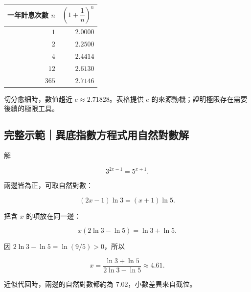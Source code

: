 \documentclass[11pt,a4paper]{article}
\newcounter{none}
\begin{document}
{\def\LTcaptype{none} %
\begin{longtable}[]{@{}rr@{}}
\toprule\noalign{}
一年計息次數 \(n\) & \(\left(1+\dfrac1n\right)^n\) \\
\midrule\noalign{}
\endhead
\bottomrule\noalign{}
\endlastfoot
\(1\) & \(2.0000\) \\
\(2\) & \(2.2500\) \\
\(4\) & \(2.4414\) \\
\(12\) & \(2.6130\) \\
\(365\) & \(2.7146\) \\
\end{longtable}
}

切分愈細時，數值趨近 \(e\approx2.71828\)。表格提供 \(e\) 的來源動機；證明極限存在需要後續的極限工具。

\begin{HandoutWorkedExample}

\subsection{完整示範｜異底指數方程式用自然對數解}\label{ux5b8cux6574ux793aux7bc4ux7570ux5e95ux6307ux6578ux65b9ux7a0bux5f0fux7528ux81eaux7136ux5c0dux6578ux89e3}

解

\[
3^{2x-1}=5^{x+1}.
\]

兩邊皆為正，可取自然對數：

\[
(2x-1)\ln3=(x+1)\ln5.
\]

把含 \(x\) 的項放在同一邊：

\[
x(2\ln3-\ln5)=\ln3+\ln5.
\]

因 \(2\ln3-\ln5=\ln(9/5)>0\)，所以

\[
\boxed{x=\frac{\ln3+\ln5}{2\ln3-\ln5}}
\approx4.61.
\]

近似代回時，兩邊的自然對數都約為 \(7.02\)，小數差異來自截位。

\end{HandoutWorkedExample}
\end{document}
